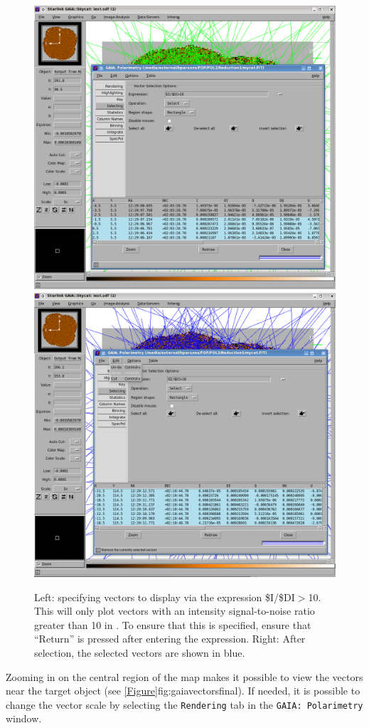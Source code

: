 \begin{figure}[t!]
\begin{center}
\includegraphics[width=0.46\linewidth]{sc22-gaia-plot-vectors-4.png}
\includegraphics[width=0.46\linewidth]{sc22-gaia-plot-vectors-6.png}
\caption [Selecting Vectors in GAIA]{Left: specifying vectors
  to display via the expression \$I/\$DI$>$10. This will only plot
  vectors with an intensity signal-to-noise
  ratio greater than 10 in \GAIA. To ensure that this is specified,
  ensure that ``Return'' is pressed after entering the expression.
  Right: After selection, the selected vectors are shown in blue.
}
\label{fig:gaiavectorssecond}
\end{center}
\end{figure}

Zooming in on the central region of the map makes it possible to view
the vectors near the target object (see \cref{Figure}{fig:gaiavectorsfinal}{}).
If needed, it is possible to change the vector scale by selecting the \texttt{Rendering}
tab in the \texttt{GAIA: Polarimetry} window.


